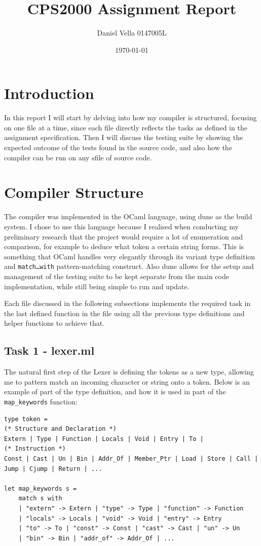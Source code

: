 \documentclass[11pt, a4paper]{article}
\title{\textbf{CPS2000 Assignment Report}}
\author{Daniel Vella 0147005L}
\date{\today}
\begin{document}
\maketitle


\section{Introduction}
In this report I will start by delving into how my compiler is structured, focusing on one file at a time,
since each file directly reflects the tasks as defined in the assignment specification. Then I will discuss the testing suite
by showing the expected outcome of the tests found in the source code, and also how the compiler can be run on any sfile of source code.

\section{Compiler Structure}
The compiler was implemented in the OCaml language, using dune as the build system. I chose to use this language because
I realised when conducting my preliminary research that the project would require a lot of enumeration and comparison, for example to deduce
what token a certain string forms. This is something that OCaml handles very elegantly through its variant type definition 
and \texttt{match\dots with} pattern-matching construct. Also dune allows for the setup and management of the testing suite
to be kept separate from the main code implementation, while still being simple to run and update.

\medskip

Each file discussed in the following subsections implements the required task in the last defined function in the file using all the
previous type definitions and helper functions to achieve that.

\subsection{Task 1 - lexer.ml}
The natural first step of the Lexer is defining the tokens as a new type, allowing me to pattern match an incoming character or string onto a token. 
Below is an example of part of the type definition, and how it is used in part of the \texttt{map\_keywords} function:

\medskip

\begin{lstlisting}[language={[Objective]Caml}]
type token = 
(* Structure and Declaration *)
Extern | Type | Function | Locals | Void | Entry | To |
(* Instruction *)
Const | Cast | Un | Bin | Addr_Of | Member_Ptr | Load | Store | Call | 
Jump | Cjump | Return | ...

let map_keywords s = 
    match s with
    | "extern" -> Extern | "type" -> Type | "function" -> Function 
    | "locals" -> Locals | "void" -> Void | "entry" -> Entry 
    | "to" -> To | "const" -> Const | "cast" -> Cast | "un" -> Un 
    | "bin" -> Bin | "addr_of" -> Addr_Of | ... 
\end{lstlisting}
\end{document}
